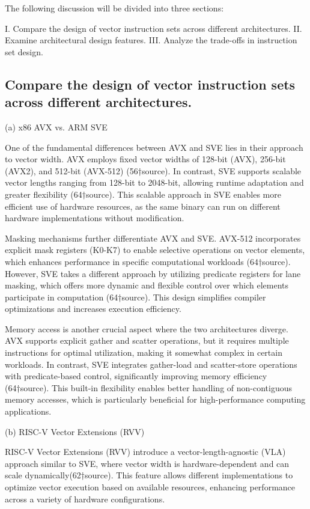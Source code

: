 \documentclass[conference]{IEEEtran}
\begin{document}
The following discussion will be divided into three sections:

I. Compare the design of vector instruction sets across different architectures.
II. Examine architectural design features.
III. Analyze the trade-offs in instruction set design.


\subsection{Compare the design of vector instruction sets across different architectures.}
(a) x86 AVX vs. ARM SVE

One of the fundamental differences between AVX and SVE lies in their approach to vector width. 
AVX employs fixed vector widths of 128-bit (AVX), 256-bit (AVX2), and 512-bit (AVX-512) (56†source). 
In contrast, SVE supports scalable vector lengths ranging from 128-bit to 2048-bit, 
allowing runtime adaptation and greater flexibility (64†source). 
This scalable approach in SVE enables more efficient use of hardware resources, as the same binary 
can run on different hardware implementations without modification.

Masking mechanisms further differentiate AVX and SVE. AVX-512 incorporates explicit mask registers (K0-K7) to enable selective operations on vector elements, which enhances performance in specific computational workloads (64†source). However, SVE takes a different approach by utilizing predicate registers for lane masking, which offers more dynamic and flexible control over which elements participate in computation (64†source). This design simplifies compiler optimizations and increases execution efficiency.

Memory access is another crucial aspect where the two architectures diverge. AVX supports explicit gather and scatter operations, but it requires multiple instructions for optimal utilization, making it somewhat complex in certain workloads. In contrast, SVE integrates gather-load and scatter-store operations with predicate-based control, significantly improving memory efficiency (64†source). This built-in flexibility enables better handling of non-contiguous memory accesses, which is particularly beneficial for high-performance computing applications.

(b) RISC-V Vector Extensions (RVV)

RISC-V Vector Extensions (RVV) introduce a vector-length-agnostic (VLA) approach similar to SVE, where vector width is hardware-dependent and can scale dynamically(62†source). This feature allows different implementations to optimize vector execution based on available resources, enhancing performance across a variety of hardware configurations.
\end{document}
